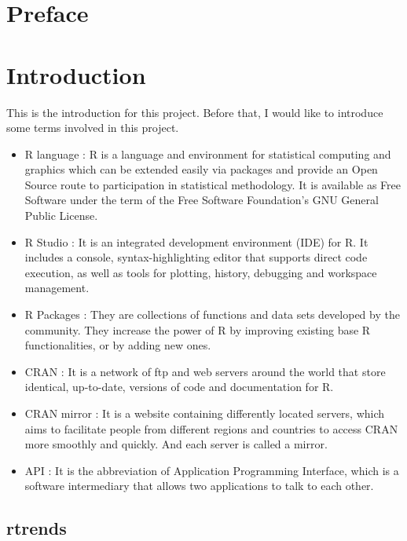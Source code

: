 \documentclass[
]{book}
\author{}
\date{\vspace{-2.5em}2021-03-16}
\begin{document}
{
\setcounter{tocdepth}{1}
\tableofcontents
}
\hypertarget{preface}{%
\chapter*{Preface}\label{preface}}

\hypertarget{intro}{%
\chapter{Introduction}\label{intro}}

This is the introduction for this project. Before that, I would like to introduce some terms involved in this project.

\begin{itemize}
\item
  R language : R is a language and environment for statistical computing and graphics which can be extended easily via packages and provide an Open Source route to participation in statistical methodology. It is available as Free Software under the term of the Free Software Foundation's GNU General Public License\citep{gnu}.
\item
  R Studio : It is an integrated development environment (IDE) for R. It includes a console, syntax-highlighting editor that supports direct code execution, as well as tools for plotting, history, debugging and workspace management.
\item
  R Packages : They are collections of functions and data sets developed by the community. They increase the power of R by improving existing base R functionalities, or by adding new ones.
\item
  CRAN : It is a network of ftp and web servers around the world that store identical, up-to-date, versions of code and documentation for R.
\item
  CRAN mirror : It is a website containing differently located servers, which aims to facilitate people from different regions and countries to access CRAN more smoothly and quickly. And each server is called a mirror.
\item
  API : It is the abbreviation of Application Programming Interface, which is a software intermediary that allows two applications to talk to each other.
\end{itemize}

\hypertarget{rtrends}{%
\section{rtrends}\label{rtrends}}
\end{document}
